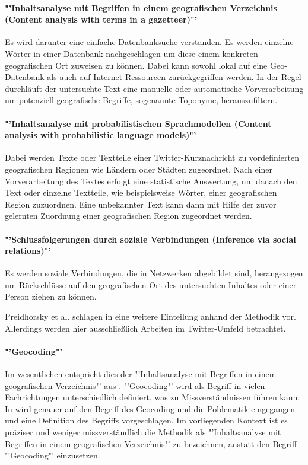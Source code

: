 		\paragraph*{"'Inhaltsanalyse mit Begriffen in einem geografischen Verzeichnis (Content analysis with terms in a gazetteer)"'}  
	
			Es wird darunter eine einfache Datenbanksuche verstanden. 
			Es werden einzelne Wörter in einer Datenbank nachgeschlagen um diese einem konkreten geografischen Ort zuweisen zu können.
			Dabei kann sowohl lokal auf eine Geo-Datenbank als auch auf Internet Ressourcen zurückgegriffen werden.  
			In der Regel durchläuft der untersuchte Text eine manuelle oder automatische Vorverarbeitung um potenziell geografische Begriffe, sogenannte Toponyme, herauszufiltern. 

		\paragraph*{"'Inhaltsanalyse mit probabilistischen Sprachmodellen (Content analysis with probabilistic language models)"'}
		
			Dabei werden Texte oder Textteile einer Twitter-Kurznachricht zu vordefinierten geografischen Regionen wie Ländern oder Städten zugeordnet. 
			Nach einer Vorverarbeitung des Textes erfolgt eine statistische Auswertung, um danach den Text oder einzelne Textteile, wie beispielsweise Wörter, einer geografischen Region zuzuordnen. 
			Eine unbekannter Text kann dann mit Hilfe der zuvor gelernten Zuordnung einer geografischen Region zugeordnet werden.

		\paragraph*{"'Schlussfolgerungen durch soziale Verbindungen (Inference via social relations)"'} 

			Es werden soziale Verbindungen, die in Netzwerken abgebildet sind, herangezogen um Rückschlüsse auf den geografischen Ort des untersuchten Inhaltes oder einer Person ziehen zu können.

		Preidhorsky et al. schlagen in \cite{Priedhorsky2013} eine weitere Einteilung anhand der Methodik vor. 
		Allerdings werden hier ausschließlich Arbeiten im Twitter-Umfeld betrachtet. 

		\paragraph*{"'Geocoding"'} Im wesentlichen entspricht dies der "'Inhaltsanalyse mit Begriffen in einem geografischen Verzeichnis"' aus \cite{Cheng2010}. 
		"'Geocoding"' wird als Begriff in vielen Fachrichtungen unterschiedlich definiert, was zu Missverständnissen führen kann. 
		In \cite{bibsmaniaaa:Goldberg2008} wird genauer auf den Begriff des Geocoding und die Poblematik eingegangen und eine Definition  des Begriffs vorgeschlagen.
		Im vorliegenden Kontext ist es präziser und weniger missverständlich die Methodik als "'Inhaltsanalyse mit Begriffen in einem geografischen Verzeichnis"' zu bezeichnen, anstatt den Begriff "'Geocoding"' einzusetzen. 
		
